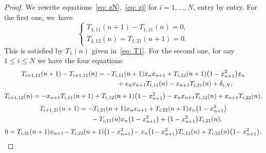 \documentclass[pdftex]{sigma}%
\numberwithin{equation}{section}
\begin{document}
	\begin{proof}
	We rewrite equations~\eqref{eq: zN},~\eqref{eq: zj} for $ i=1,\dots,N$, entry by entry.
	For the first one, we~have
			\begin{equation*}
	\begin{cases}
		T_{1,11}(n+1)-T_{1,11}(n)=0,\\
		T_{1,12}(n)=T_{1,21}(n+1)=0.
	\end{cases}
		\end{equation*}
	This is satisfied by $T_1(n) $ given in~\eqref{eq: T1}. For the second one, for any $1\leqslant i\leqslant N$ we have the four equations:
\begin{gather*}
T_{i+1,11}(n+1)-T_{i+1,11}(n)=-T_{i,11}(n+1)x_n x_{n+1} +T_{i,12}(n+1)\big(1-x_{n+1}^2\big)x_n
\\ \hphantom{T_{i+1,11}(n+1)-T_{i+1,11}(n)=}
{}+x_nx_{n+1}T_{i,11}(n)-x_{n+1}T_{i,21}(n)+\delta_{i,N},
\\[1mm]		T_{i+1,12}(n)=-x_{n+1}T_{i,11}(n+1)+T_{i,12}(n+1)\big(1-x_{n+1}^2\big)-x_nx_{n+1}T_{i,12}(n)+x_{n+1}T_{i,22}(n),
\\[1mm]	
T_{i+1,21}(n+1)=-T_{i,21}(n+1)x_nx_{n+1}+T_{i,22}(n+1)x_n\big(1-x_{n+1}^2\big)
\\\hphantom{T_{i+1,21}(n+1)=}
{}-T_{i,11}(n)x_n\big(1-x_{n+1}^2\big)+\big(1-x_{n+1}^2\big)T_{i,21}(n),
\\[1mm]	
0=T_{i,21}(n+1)x_{n+1}\!-T_{i,22}(n+1)\big(1\!-x_{n+1}^2\big)\!-x_n\big(1\!-x_{n+1}^2\big)T_{i,12}(n)+T_{i,22}(n)\big(1\!-x_{n+1}^2\big).		\label{EqRecTi22}
\end{gather*}


\end{proof}
\end{document}
